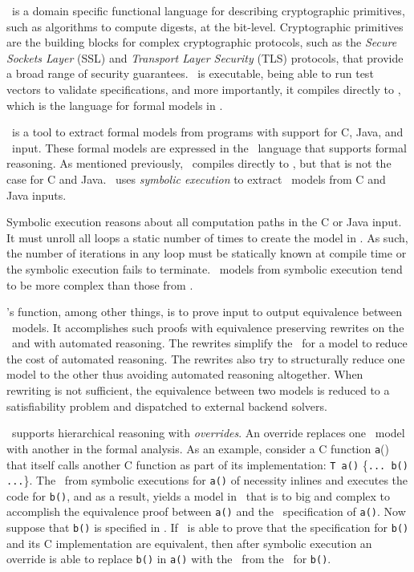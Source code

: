 \cryptol\ is a domain specific functional language for describing cryptographic primitives, such as algorithms to compute digests, at the bit-level.
Cryptographic primitives are the building blocks for complex cryptographic protocols, such as the \emph{Secure Sockets Layer} (SSL) and \emph{Transport Layer Security} (TLS) protocols, that provide a broad range of security guarantees.
\cryptol\ is executable, being able to run test vectors to validate specifications, and more importantly, it compiles directly to \sawcore, which is the language for formal models in \saw.

\saw\ is a tool to extract formal models from programs with support for C, Java, and \cryptol\ input.
These formal models are expressed in the \sawcore\ language that supports formal reasoning.
As mentioned previously, \cryptol\ compiles directly to \sawcore, but that is not the case for C and Java.
\saw\ uses \emph{symbolic execution} to extract \sawcore\ models from C and Java inputs.

Symbolic execution reasons about all computation paths in the C or Java input.
It must unroll all loops a static number of times to create the model in \sawcore.
As such, the number of iterations in any loop must be statically known at compile time or the symbolic execution fails to terminate.
\sawcore\ models from symbolic execution tend to be more complex than those from \cryptol.

\saw's function, among other things, is to prove input to output equivalence between \sawcore\ models.
It accomplishes such proofs with equivalence preserving rewrites on the \sawcore\ and with automated reasoning.
The rewrites simplify the \sawcore\ for a model to reduce the cost of automated reasoning. 
The rewrites also try to structurally reduce one model to the other thus avoiding automated reasoning altogether.
When rewriting is not sufficient, the equivalence between two models is reduced to a satisfiability problem and dispatched to external backend solvers.

\saw\ supports hierarchical reasoning with \emph{overrides}.
An override replaces one \sawcore\ model with another in the formal analysis.
As an example, consider a C function \texttt{a}() that itself calls another C function as part of its implementation: \texttt{T a()} \{\texttt{... b() ...}\}.
The \sawcore\ from symbolic executions for \texttt{a()} of necessity inlines and executes the code for \texttt{b()}, and as a result, yields a model in \sawcore\ that is to big and complex to accomplish the equivalence proof between \texttt{a()} and the \cryptol\ specification of \texttt{a()}.
Now suppose that \texttt{b()} is specified in \cryptol.
If \saw\ is able to prove that the specification for \texttt{b()} and its C implementation are equivalent, then after symbolic execution an override is able to replace \texttt{b()} in \texttt{a()} with the \sawcore\ from the \cryptol\ for \texttt{b()}.

